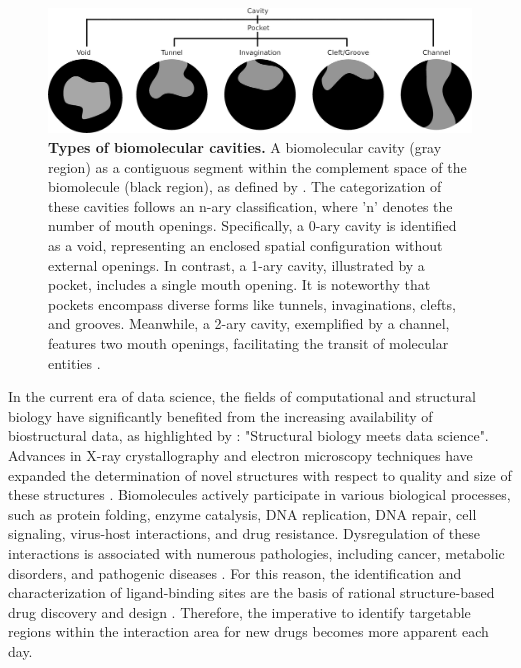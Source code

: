 \documentclass[Ingles]{phdthesis}
\begin{document}
\begin{figure}[ht]
  \centerline{\includegraphics[scale=1]{images/cavity-classification.png}}
  \caption[Types of biomolecular cavities]{\textbf{Types of biomolecular cavities.} A biomolecular cavity (gray region) as a contiguous segment within the complement space of the biomolecule (black region), as defined by \cite{lay2013}. The categorization of these cavities follows an n-ary classification, where 'n' denotes the number of mouth openings. Specifically, a 0-ary cavity is identified as a void, representing an enclosed spatial configuration without external openings. In contrast, a 1-ary cavity, illustrated by a pocket, includes a single mouth opening. It is noteworthy that pockets encompass diverse forms like tunnels, invaginations, clefts, and grooves. Meanwhile, a 2-ary cavity, exemplified by a channel, features two mouth openings, facilitating the transit of molecular entities \cite{simoes2017}.}
  \label{fig:cavity-classification}
\end{figure}

In the current era of data science, the fields of computational and structural biology have significantly benefited from the increasing availability of biostructural data, as highlighted by \cite{mura2018}: "Structural biology meets data science". Advances in X-ray crystallography and electron microscopy techniques have expanded the determination of novel structures with respect to quality and size of these structures \cite{burley2018}. Biomolecules actively participate in various biological processes, such as protein folding, enzyme catalysis, DNA replication, DNA repair, cell signaling, virus-host interactions, and drug resistance. Dysregulation of these interactions is associated with numerous pathologies, including cancer, metabolic disorders, and pathogenic diseases \cite{scott2013}. For this reason, the identification and characterization of ligand-binding sites are the basis of rational structure-based drug discovery and design \cite{sotriffer2002,henrich2010}. Therefore, the imperative to identify targetable regions within the interaction area for new drugs becomes more apparent each day.
\end{document}
